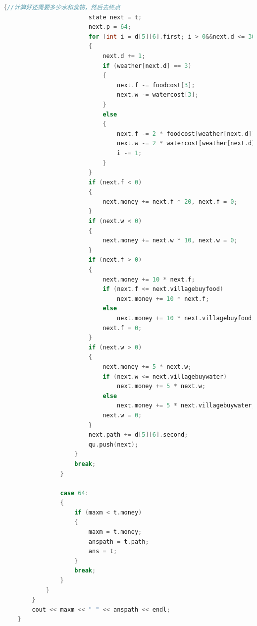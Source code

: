 \documentclass[withoutpreface,bwprint]{cumcmthesis} %
\begin{document}
\begin{appendices}
\begin{lstlisting}[language=c++]
                    {//计算好还需要多少水和食物，然后去终点
                        state next = t;
                        next.p = 64;
                        for (int i = d[5][6].first; i > 0&&next.d <= 30;)
                        {
                            next.d += 1;
                            if (weather[next.d] == 3)
                            {
                                next.f -= foodcost[3];
                                next.w -= watercost[3];
                            }
                            else
                            {
                                next.f -= 2 * foodcost[weather[next.d]];
                                next.w -= 2 * watercost[weather[next.d]];
                                i -= 1;
                            }
                        }
                        if (next.f < 0)
                        {
                            next.money += next.f * 20, next.f = 0;
                        }
                        if (next.w < 0)
                        {
                            next.money += next.w * 10, next.w = 0;
                        }
                        if (next.f > 0)
                        {
                            next.money += 10 * next.f;
                            if (next.f <= next.villagebuyfood)
                                next.money += 10 * next.f;
                            else
                                next.money += 10 * next.villagebuyfood;
                            next.f = 0;
                        }
                        if (next.w > 0)
                        {
                            next.money += 5 * next.w;
                            if (next.w <= next.villagebuywater)
                                next.money += 5 * next.w;
                            else
                                next.money += 5 * next.villagebuywater;
                            next.w = 0;
                        }
                        next.path += d[5][6].second;
                        qu.push(next);
                    }
                    break;
                }
    
                case 64:
                {
                    if (maxm < t.money)
                    {
                        maxm = t.money;
                        anspath = t.path;
                        ans = t;
                    }
                    break;
                }
            }
        }
        cout << maxm << " " << anspath << endl;
    }
\end{lstlisting}


\end{appendices}
\end{document}
